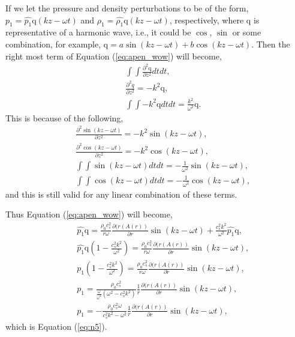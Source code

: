 If we let the pressure and density perturbations to be of the form, $p_1=\hat{p_1}\mathrm{q}(kz-\omega t)$ and $\rho_1=\hat{\rho_1}\mathrm{q}(kz-\omega t)$, respectively, where $\mathrm{q}$ is representative of a harmonic wave, i.e., it could be $\cos$, $\sin$ or some combination, for example, $\mathrm{q} = a \sin(kz-\omega t) + b \cos(kz-\omega t)$.
Then the right most term of Equation (\ref{eq:apen_wow}) will become,
\begin{align}
&&\int\int \frac{\partial^2 \mathrm{q}}{\partial z^2} dt dt,\\
&&\frac{\partial^2 q}{\partial z^2} = - k^2 \mathrm{q},\\
&&\int\int - k^2 \mathrm{q} dt dt = \frac{k^2}{\omega^2}\mathrm{q}.
\end{align}
This is because of the following,
\begin{align}
&&\frac{\partial^2 \sin(kz-\omega t)}{\partial z^2} = -k^2\sin(kz-\omega t),\\
&&\frac{\partial^2 \cos(kz-\omega t)}{\partial z^2} = -k^2\cos(kz-\omega t),\\
&&\int\int \sin(kz-\omega t) dt dt = -\frac{1}{\omega^2}\sin(kz-\omega t),\\
&&\int\int \cos(kz-\omega t) dt dt = -\frac{1}{\omega^2}\cos(kz-\omega t),
\end{align}
and this is still valid for any linear combination of these terms.

Thus Equation (\ref{eq:apen_wow}) will become,
\begin{align}
&& \hat{p_1}\mathrm{q} = \frac{\rho_0 c_s^2}{r\omega}\frac{\partial(r(A(r))}{\partial r} \sin(kz-\omega t) + \frac{c_s^2 k^2}{\omega^2}\hat{p_1}\mathrm{q},\\
&& \hat{p_1}\mathrm{q}\left(1 - \frac{c_s^2 k^2}{\omega^2} \right) = \frac{\rho_0 c_s^2}{r\omega}\frac{\partial(r(A(r))}{\partial r} \sin(kz-\omega t),\\
&& p_1\left(1 - \frac{c_s^2 k^2}{\omega^2} \right) = \frac{\rho_0 c_s^2}{r\omega}\frac{\partial(r(A(r))}{\partial r} \sin(kz-\omega t),\\
&& p_1 = \frac{\rho_0 c_s^2}{\frac{\omega}{\omega^2}(\omega^2- c_s^2k^2)}\frac{1}{r}\frac{\partial(r(A(r))}{\partial r} \sin(kz-\omega t),\\
&& p_1 = -\frac{\rho_0 c_s^2 \omega}{c_s^2k^2 - \omega^2}\frac{1}{r}\frac{\partial(r(A(r))}{\partial r} \sin(kz-\omega t),
\end{align}
which is Equation (\ref{eq:n5}).